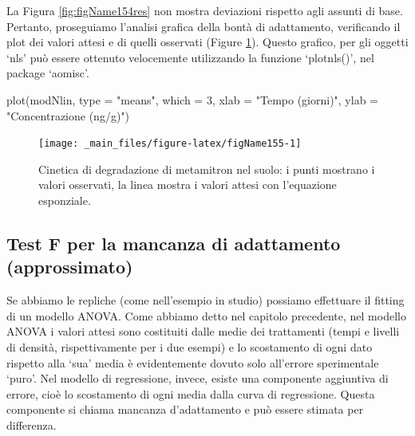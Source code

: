 \documentclass[a4paper,12pt,oneside]{book}
\newenvironment{Shaded}{\begin{snugshade}}{\end{snugshade}}
\newcommand{\DecValTok}[1]{#1}
\newcommand{\StringTok}[1]{#1}
\newcommand{\FunctionTok}[1]{#1}
\newcommand{\AttributeTok}[1]{#1}
\newcommand{\NormalTok}[1]{#1}
\begin{document}
La Figura \ref{fig:figName154res} non mostra deviazioni rispetto agli assunti di base. Pertanto, proseguiamo l'analisi grafica della bontà di adattamento, verificando il plot dei valori attesi e di quelli osservati (Figure \ref{fig:figName155}). Questo grafico, per gli oggetti `nls' può essere ottenuto velocemente utilizzando la funzione `plotnls()', nel package `aomisc'.

\begin{Shaded}
\begin{Highlighting}[]
\FunctionTok{plot}\NormalTok{(modNlin, }\AttributeTok{type =} \StringTok{"means"}\NormalTok{, }\AttributeTok{which =} \DecValTok{3}\NormalTok{,}
        \AttributeTok{xlab =} \StringTok{"Tempo (giorni)"}\NormalTok{, }\AttributeTok{ylab =} \StringTok{"Concentrazione (ng/g)"}\NormalTok{)}
\end{Highlighting}
\end{Shaded}

\begin{figure}

{\centering \texttt{[image: \_main\_files/figure-latex/figName155-1]} 

}

\caption{Cinetica di degradazione di metamitron nel suolo: i punti mostrano i valori osservati, la linea mostra i valori attesi con l'equazione esponziale.}\label{fig:figName155}
\end{figure}

\hypertarget{test-f-per-la-mancanza-di-adattamento-approssimato}{%
\subsection{Test F per la mancanza di adattamento (approssimato)}\label{test-f-per-la-mancanza-di-adattamento-approssimato}}

Se abbiamo le repliche (come nell'esempio in studio) possiamo effettuare il fitting di un modello ANOVA. Come abbiamo detto nel capitolo precedente, nel modello ANOVA i valori attesi sono costituiti dalle medie dei trattamenti (tempi e livelli di densità, rispettivamente per i due esempi) e lo scostamento di ogni dato rispetto alla `sua' media è evidentemente dovuto solo all'errore sperimentale `puro'. Nel modello di regressione, invece, esiste una componente aggiuntiva di errore, cioè lo scostamento di ogni media dalla curva di regressione. Questa componente si chiama mancanza d'adattamento e può essere stimata per differenza.
\end{document}
